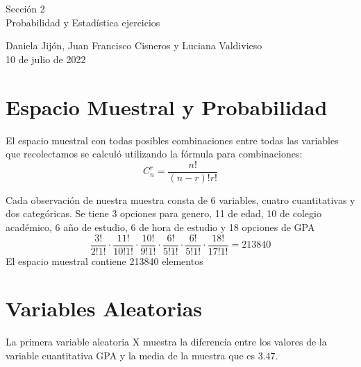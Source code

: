 \documentclass[12pt]{article}
\begin{document}
\begin{center}
 	{\Huge Sección 2}\\
	 \vspace{0.75cm}
	 {\large Probabilidad y Estadística ejercicios}\\
	 \vspace{0.5cm}
\end{center}
{\large Daniela Jijón, Juan Francisco Cisneros y Luciana Valdivieso}\\
\vspace{0.5cm}
{\large10 de julio de 2022}\\

\setlength{\parskip}{\baselineskip}%



\section{Espacio Muestral y Probabilidad}

El espacio muestral con todas posibles combinaciones entre todas las variables que recolectamos se calculó utilizando la fórmula para combinaciones:
\begin{equation}
   C_{n}^r = \frac{n!}{(n-r)!r!}
\end{equation}

Cada observación de nuestra muestra consta de 6 variables, cuatro cuantitativas y dos categóricas. Se tiene 3 opciones para genero, 11 de edad, 10 de colegio académico, 6 año de estudio, 6 de hora de estudio y 18 opciones de GPA
\begin{equation*}
    \frac{3!}{2!1!}\cdot \frac{11!}{10!1!} \cdot\frac{10!}{9!1!} \cdot\frac{6!}{5!1!}\cdot  \frac{6!}{5!1!} \cdot \frac{18!}{17!1!}=213840
\end{equation*}
El espacio muestral contiene 213840 elementos

\section{Variables Aleatorias}
La primera variable aleatoria X muestra la diferencia entre los valores de la variable cuantitativa GPA y la media de la muestra que es 
$3.47$. 
\end{document}
